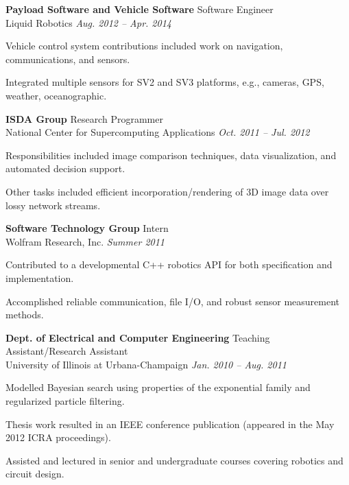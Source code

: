 \documentclass[article]{resume}
\begin{document}
    \textbf{Payload Software and Vehicle Software} \hfill Software Engineer\\  
    Liquid Robotics \hfill \textsl{Aug. 2012 -- Apr. 2014} \\
    \vspace{ -2 mm}
    \begin{list2}
        \item Vehicle control system contributions included work on navigation, communications, and sensors.
        \item Integrated multiple sensors for SV2 and SV3 platforms, e.g., cameras, GPS, weather, oceanographic.
    \end{list2}\vspace{-2mm}

    \textbf{ISDA Group} \hfill Research Programmer\\  
    National Center for Supercomputing Applications \hfill \textsl{Oct. 2011 -- Jul. 2012} \\
    \vspace{ -2 mm}
    \begin{list2}
        \item Responsibilities included image comparison techniques, data visualization, and automated decision support. 
        \item Other tasks included efficient incorporation/rendering of 3D image data over lossy network streams.  
    \end{list2}\vspace{-2mm}
   
    \textbf{Software Technology Group} \hfill Intern\\  
    Wolfram Research, Inc. \hfill \textsl{Summer 2011} \\
    \vspace{ -2 mm}
    \begin{list2}
        \item Contributed to a developmental C++ robotics API for both specification and implementation.
	 \item Accomplished reliable communication, file I/O, and robust sensor measurement methods. 
    \end{list2}\vspace{-2mm}

    \textbf{Dept. of Electrical and Computer Engineering} \hfill Teaching Assistant/Research Assistant \\  
    University of Illinois at Urbana-Champaign \hfill \textsl{Jan. 2010 -- Aug. 2011} \\
    \vspace{ -2 mm}
    \begin{list2}
        \item Modelled Bayesian search using properties of the exponential family and regularized particle filtering.
	 \item Thesis work resulted in an IEEE conference publication (appeared in the May 2012 ICRA proceedings).  
        \item Assisted and lectured in senior and undergraduate courses covering robotics and circuit design.
    \end{list2}\vspace{-2mm}
\end{document}
